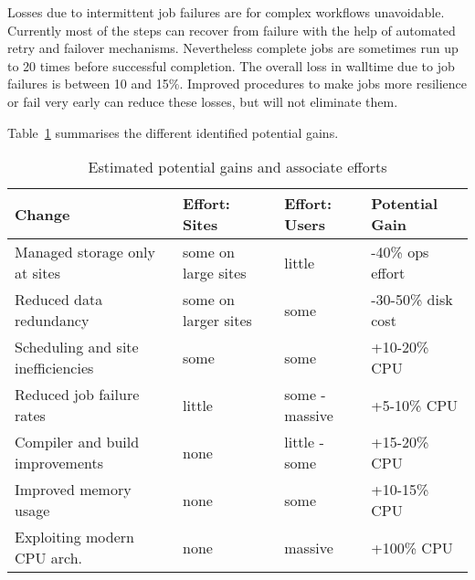 Losses due to intermittent job failures are for complex workflows
unavoidable. Currently most of the steps can recover from failure with
the help of automated retry and failover mechanisms. Nevertheless
complete jobs are sometimes run up to 20 times before successful
completion. The overall loss in walltime due to job failures is
between 10 and 15\%. Improved procedures to make jobs more resilience
or fail very early can reduce these losses, but will not eliminate
them.

Table~\ref{tab:pgain} summarises the different identified potential gains.

\begin{table}
  \centering
  \caption{Estimated potential gains and associate efforts}
  \label{tab:pgain}
  \begin{tabular}{llll}
    \hline
    \textbf{Change} & \textbf{Effort: Sites} & \textbf{Effort: Users} & \textbf{Potential Gain}  \\\hline
    Managed storage only at sites & some on large sites & little & -40\% ops effort \\
    Reduced data redundancy & some on larger sites & some & -30-50\% disk cost \\
    Scheduling and site inefficiencies & some & some & +10-20\% CPU  \\
    Reduced job failure rates & little & some - massive & +5-10\% CPU \\
    Compiler and build improvements & none &  little - some & +15-20\% CPU \\
    Improved memory usage & none & some &  +10-15\% CPU \\ 
    Exploiting modern CPU arch. &  none & massive & +100\% CPU \\\hline
  \end{tabular}
\end{table}
